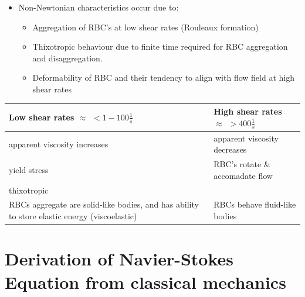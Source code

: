 \documentclass{beamer}
\begin{document}
	
			    \begin{frame}
			    \begin{itemize}
			      	\item Non-Newtonian characteristics occur due to: \begin{itemize}
    	    \item Aggregation of RBC's at low shear rates (Rouleaux formation)
    	    \item Thixotropic behaviour due to finite time required for RBC aggregation and disaggregation.
    	    \item Deformability of RBC and their tendency to align with flow field at high shear rates
    	\end{itemize}
    	\end{itemize}
			            \begin{table}[h]
    		\centering
    		\begin{tabular}{p{5cm}p{5cm}}
    			Low shear rates $\approx \hspace{5pt}< 1-100 \frac{1}{s}$ & High shear rates $\approx\hspace{5pt} > 400 \frac{1}{s}$ \\
    			\hline
    			apparent viscosity increases & apparent viscosity decreases \\
    		 yield stress & RBC's rotate \& accomadate flow\\
    		thixotropic  & \\
    	 RBCs aggregate are solid-like bodies, and  has ability to store elastic energy (viscoelastic) & RBCs behave fluid-like  bodies\\ 
    		\end{tabular}
    	\end{table}
		    \end{frame}
	\section[Classical Mechanics]{Derivation of Navier-Stokes Equation from classical mechanics}
\end{document}
